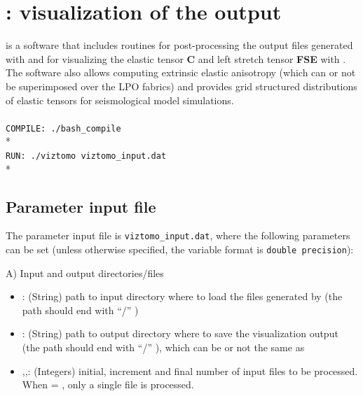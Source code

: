 \chapter{\viztomotitle: visualization of the \drexmtitle{} output} 
\label{chapter:viztomo}

\viztomotitle{} is a software that includes routines for post-processing the \cijkltitle{} output files generated with \drexmtitle{} and for visualizing the elastic tensor \textbf{C} and left stretch tensor \textbf{FSE} with \paraviewtitle{}. The software also allows computing extrinsic elastic anisotropy (which can or not be superimposed over the LPO fabrics) and provides grid structured distributions of elastic tensors for seismological model simulations.\\
\\
\texttt{COMPILE: ./bash\_compile}\\*
\\
\texttt{RUN: ./viztomo viztomo\_input.dat}\\*

\section{Parameter input file}

The parameter input file is \texttt{viztomo\_input.dat}, where the following parameters can be set (unless otherwise specified, the variable format is \texttt{double precision}): 

A) Input and output directories/files
\begin{itemize}
    \item {}: (String) path to input directory where to load the \cijkltitle{} files generated by \drexmtitle{} (the path should end with  “/” )
	\item {}: (String) path to output directory where to save the visualization output (the path should end with  “/” ), which can be or not the same as 
	\item {},,: (Integers) initial, increment and final number of input \cijkltitle{} files to be processed. When  = , only a single \cijkltitle{} file is processed.
\end{itemize}

